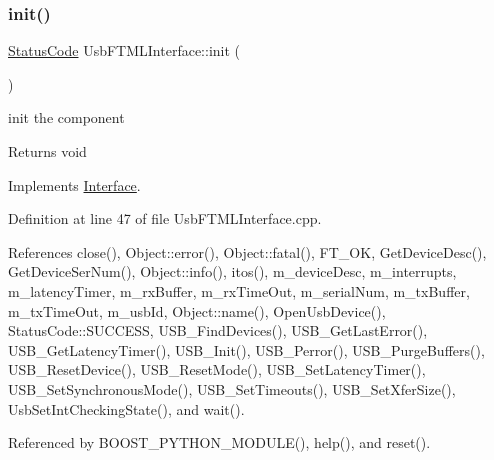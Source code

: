 \subsubsection{\texorpdfstring{init()}{init()}}
{\footnotesize\ttfamily \hyperlink{classStatusCode}{Status\+Code} Usb\+F\+T\+M\+L\+Interface\+::init (\begin{DoxyParamCaption}{ }\end{DoxyParamCaption})\hspace{0.3cm}{\ttfamily [virtual]}}

init the component

\begin{DoxyReturn}{Returns}
void 
\end{DoxyReturn}


Implements \hyperlink{classInterface_a1d095c113b1e89d1f5f68323856fee63}{Interface}.



Definition at line 47 of file Usb\+F\+T\+M\+L\+Interface.\+cpp.



References close(), Object\+::error(), Object\+::fatal(), F\+T\+\_\+\+OK, Get\+Device\+Desc(), Get\+Device\+Ser\+Num(), Object\+::info(), itos(), m\+\_\+device\+Desc, m\+\_\+interrupts, m\+\_\+latency\+Timer, m\+\_\+rx\+Buffer, m\+\_\+rx\+Time\+Out, m\+\_\+serial\+Num, m\+\_\+tx\+Buffer, m\+\_\+tx\+Time\+Out, m\+\_\+usb\+Id, Object\+::name(), Open\+Usb\+Device(), Status\+Code\+::\+S\+U\+C\+C\+E\+SS, U\+S\+B\+\_\+\+Find\+Devices(), U\+S\+B\+\_\+\+Get\+Last\+Error(), U\+S\+B\+\_\+\+Get\+Latency\+Timer(), U\+S\+B\+\_\+\+Init(), U\+S\+B\+\_\+\+Perror(), U\+S\+B\+\_\+\+Purge\+Buffers(), U\+S\+B\+\_\+\+Reset\+Device(), U\+S\+B\+\_\+\+Reset\+Mode(), U\+S\+B\+\_\+\+Set\+Latency\+Timer(), U\+S\+B\+\_\+\+Set\+Synchronous\+Mode(), U\+S\+B\+\_\+\+Set\+Timeouts(), U\+S\+B\+\_\+\+Set\+Xfer\+Size(), Usb\+Set\+Int\+Checking\+State(), and wait().



Referenced by B\+O\+O\+S\+T\+\_\+\+P\+Y\+T\+H\+O\+N\+\_\+\+M\+O\+D\+U\+L\+E(), help(), and reset().


